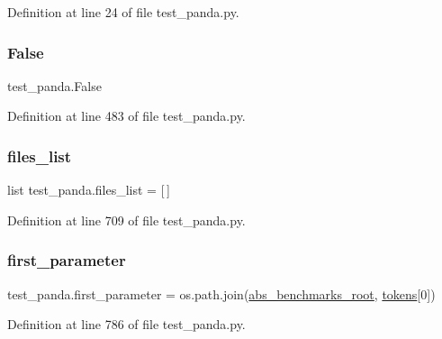 Definition at line 24 of file test\+\_\+panda.\+py.

\mbox{\label{namespacetest__panda_af93daddc6b1a54e0ad3c68aa4c89eb92}} 
\subsubsection{\texorpdfstring{False}{False}}
{\footnotesize\ttfamily test\+\_\+panda.\+False}



Definition at line 483 of file test\+\_\+panda.\+py.

\mbox{\label{namespacetest__panda_a11a46c02568d040641ee8a443cc54523}} 
\subsubsection{\texorpdfstring{files\+\_\+list}{files\_list}}
{\footnotesize\ttfamily list test\+\_\+panda.\+files\+\_\+list = \mbox{[}$\,$\mbox{]}}



Definition at line 709 of file test\+\_\+panda.\+py.

\mbox{\label{namespacetest__panda_aeecf7e98e2fb79a7524ba0a517d191fc}} 
\subsubsection{\texorpdfstring{first\+\_\+parameter}{first\_parameter}}
{\footnotesize\ttfamily test\+\_\+panda.\+first\+\_\+parameter = os.\+path.\+join(\hyperlink{namespacetest__panda_a420b78aa50adb0ce19e2fe6e434faa66}{abs\+\_\+benchmarks\+\_\+root}, \hyperlink{namespacetest__panda_a2d26dd74cc87c155c90e49e45383a469}{tokens}\mbox{[}0\mbox{]})}



Definition at line 786 of file test\+\_\+panda.\+py.

\mbox{\label{namespacetest__panda_a03e7214bb0aee93ed5a755f3e6043c2e}} 
